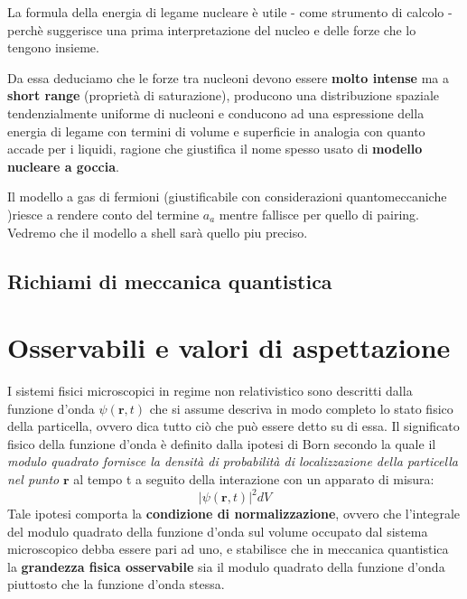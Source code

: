 La formula della energia di legame nucleare è utile - come strumento di
calcolo - perchè suggerisce una prima interpretazione del nucleo e delle
forze che lo tengono insieme.

Da essa deduciamo che le forze tra nucleoni devono essere \textbf{molto
intense} ma a \textbf{short range} (proprietà di saturazione), producono
una distribuzione spaziale tendenzialmente uniforme di nucleoni e
conducono ad una espressione della energia di legame con termini di
volume e superficie in analogia con quanto accade per i liquidi, ragione
che giustifica il nome spesso usato di \textbf{modello nucleare a
goccia}.

Il modello a gas di fermioni (giustificabile con considerazioni
quantomeccaniche )riesce a rendere conto del termine \(a_{a}\) mentre
fallisce per quello di pairing.
Vedremo che il modello a shell sarà
quello piu preciso.

\hypertarget{richiami-di-meccanica-quantistica}{%
    \subsection{Richiami di meccanica
    quantistica}\label{richiami-di-meccanica-quantistica}}

\section{Osservabili e valori di aspettazione}\label{sec:osservabili-e-valori-di-aspettazione}

I sistemi fisici microscopici in regime non relativistico sono descritti
dalla funzione d'onda \(\psi(\bm{r},t)\) che si assume descriva in modo
completo lo stato fisico della particella, ovvero dica tutto ciò che può
essere detto su di essa.
Il significato fisico della funzione d'onda è
definito dalla ipotesi di Born secondo la quale il \emph{modulo quadrato
fornisce la densità di probabilità di localizzazione della particella
nel punto} \(\bm{r}\) al tempo t a seguito della interazione con un
apparato di misura: \[
                        | \psi(\bm{r},t)|^{2}dV
\] Tale ipotesi comporta la \textbf{condizione di normalizzazione},
ovvero che l'integrale del modulo quadrato della funzione d'onda sul
volume occupato dal sistema microscopico debba essere pari ad uno, e
stabilisce che in meccanica quantistica la \textbf{grandezza fisica
osservabile} sia il modulo quadrato della funzione d'onda piuttosto che
la funzione d'onda stessa.

